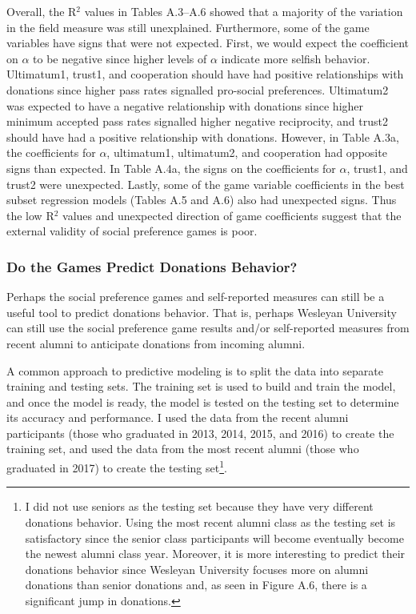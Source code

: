 \documentclass[12pt]{article}
\begin{document}
Overall, the R$^{2}$ values in Tables A.3--A.6 showed that a majority of the variation in the field measure was still unexplained. Furthermore, some of the game variables have signs that were not expected. First, we would expect the coefficient on \(\alpha\) to be negative since higher levels of \(\alpha\) indicate more selfish behavior. Ultimatum1, trust1, and cooperation should have had positive relationships with donations since higher pass rates signalled pro-social preferences. Ultimatum2 was expected to have a negative relationship with donations since higher minimum accepted pass rates signalled higher negative reciprocity, and trust2 should have had a positive relationship with donations. However, in Table A.3a, the coefficients for \(\alpha\), ultimatum1, ultimatum2, and cooperation had opposite signs than expected. In Table A.4a, the signs on the coefficients for \(\alpha\), trust1, and trust2 were unexpected. Lastly, some of the game variable coefficients in the best subset regression models (Tables A.5 and A.6) also had unexpected signs. Thus the low R$^{2}$ values and unexpected direction of game coefficients suggest that the external validity of social preference games is poor.


\subsubsection{Do the Games Predict Donations Behavior?}

Perhaps the social preference games and self-reported measures can still be a useful tool to predict donations behavior. That is, perhaps Wesleyan University can still use the social preference game results and/or self-reported measures from recent alumni to anticipate donations from incoming alumni.

A common approach to predictive modeling is to split the data into separate training and testing sets. The training set is used to build and train the model, and once the model is ready, the model is tested on the testing set to determine its accuracy and performance. I used the data from the recent alumni participants (those who graduated in 2013, 2014, 2015, and 2016) to create the training set, and used the data from the most recent alumni (those who graduated in 2017) to create the testing set\footnote{I did not use seniors as the testing set because they have very different donations behavior. Using the most recent alumni class as the testing set is satisfactory since the senior class participants will become eventually become the newest alumni class year. Moreover, it is more interesting to predict their donations behavior since Wesleyan University focuses more on alumni donations than senior donations and, as seen in Figure A.6, there is a significant jump in donations.}. 
\end{document}
